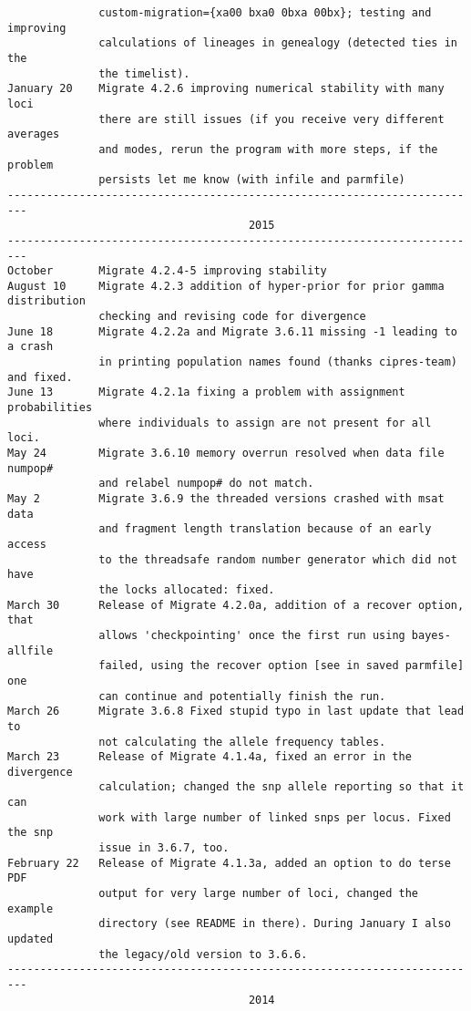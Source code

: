 \begin{small}
\begin{verbatim}
              custom-migration={xa00 bxa0 0bxa 00bx}; testing and improving
              calculations of lineages in genealogy (detected ties in the
              the timelist).
January 20    Migrate 4.2.6 improving numerical stability with many loci 
              there are still issues (if you receive very different averages
              and modes, rerun the program with more steps, if the problem
              persists let me know (with infile and parmfile)  
-------------------------------------------------------------------------
                                     2015
-------------------------------------------------------------------------
October       Migrate 4.2.4-5 improving stability
August 10     Migrate 4.2.3 addition of hyper-prior for prior gamma distribution
              checking and revising code for divergence   
June 18       Migrate 4.2.2a and Migrate 3.6.11 missing -1 leading to a crash 
              in printing population names found (thanks cipres-team) and fixed.
June 13       Migrate 4.2.1a fixing a problem with assignment probabilities
              where individuals to assign are not present for all loci. 
May 24        Migrate 3.6.10 memory overrun resolved when data file numpop# 
              and relabel numpop# do not match.
May 2         Migrate 3.6.9 the threaded versions crashed with msat data 
              and fragment length translation because of an early access
              to the threadsafe random number generator which did not have
              the locks allocated: fixed.
March 30      Release of Migrate 4.2.0a, addition of a recover option, that
              allows 'checkpointing' once the first run using bayes-allfile
              failed, using the recover option [see in saved parmfile] one
              can continue and potentially finish the run. 
March 26      Migrate 3.6.8 Fixed stupid typo in last update that lead to
              not calculating the allele frequency tables. 
March 23      Release of Migrate 4.1.4a, fixed an error in the divergence
              calculation; changed the snp allele reporting so that it can
              work with large number of linked snps per locus. Fixed the snp
              issue in 3.6.7, too.
February 22   Release of Migrate 4.1.3a, added an option to do terse PDF 
              output for very large number of loci, changed the example
              directory (see README in there). During January I also updated 
              the legacy/old version to 3.6.6. 
-------------------------------------------------------------------------
                                     2014

\end{verbatim}
\end{small}
